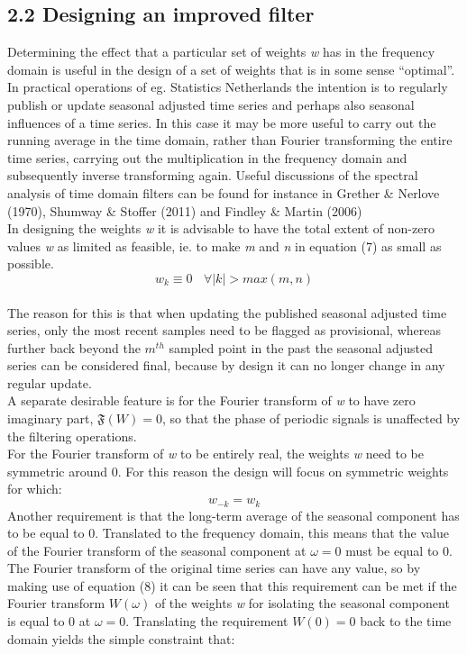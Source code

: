 \documentclass{article}
\begin{document}
\subsection*{2.2 \small Designing an improved filter}
Determining the effect that a particular set of weights \textit{w} has in the frequency domain is useful in the design of a set of weights that is in some sense ``optimal''. In practical operations of eg. Statistics Netherlands the intention is to regularly publish or update seasonal adjusted time series and perhaps also seasonal influences of a time series. In this case it may be more useful to carry out the running average in the time domain, rather than Fourier transforming the entire time series, carrying out the multiplication in the frequency domain and subsequently inverse transforming again. Useful discussions of the spectral analysis of time domain filters can be found for instance in Grether \& Nerlove (1970), Shumway \& Stoffer (2011) and Findley \& Martin (2006)\\In designing the weights \textit{w} it is advisable  to have the total extent of non-zero values \textit{w} as limited as feasible, ie. to make \textit{m} and \textit{n} in equation (7) as small as possible.
\begin{equation}
w_k \equiv 0 \ \ \ \ \forall |k| > max(m,n)
\end{equation}
\\The reason for this is that when updating the published seasonal adjusted time series, only the most recent samples need to be flagged as provisional, whereas further back beyond the $m^{th}$ sampled point in the past the seasonal adjusted series can be considered final, because by design it can no longer change in any regular update.\\A separate desirable feature is for the Fourier transform of \textit{w} to have zero imaginary part, $\mathfrak{F}(W) = 0$, so that the phase of periodic signals is unaffected by the filtering operations.\\For the Fourier transform of \textit{w} to be entirely real, the weights \textit{w} need to be symmetric around 0. For this reason the design will focus on symmetric weights for which:
\begin{equation}
w_{-k} = w_k
\end{equation}
Another requirement is that the long-term average of the seasonal component has to be equal to 0. Translated to the frequency domain, this means that the value of the Fourier transform of the seasonal component at $\omega=0$ must be equal to 0. The Fourier transform of the original time series can have any value, so by making use of equation (8) it can be seen that this requirement can be met if the Fourier transform $W(\omega)$ of the weights \textit{w} for isolating the seasonal component is equal to 0 at $\omega=0$.  Translating the requirement $W(0)=0$ back to the time domain yields the simple constraint that:
\end{document}
